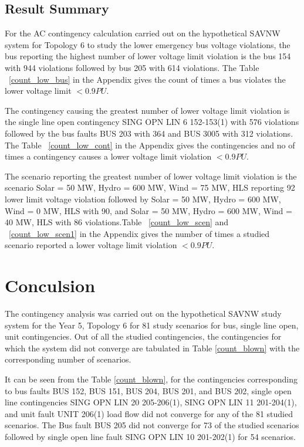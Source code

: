 \documentclass[10pt]{report}
\begin{document}
\section{Result Summary}
For the AC contingency calculation carried out on the hypothetical SAVNW system for Topology 6 to study the lower emergency bus voltage violations, the bus reporting the highest number of lower voltage limit violation is the bus 154 with 944 violations followed by bus 205 with 614 violations. The Table ~\ref{count_low_bus} in the Appendix gives the count of times a bus violates the lower voltage limit $ < 0.9 PU $. 


The contingency causing the greatest number of lower voltage limit violation is the single line open contingency SING OPN LIN 6 152-153(1) with 576 violations followed by the bus faults BUS 203 with 364 and BUS 3005 with 312 violations. The Table ~\ref{count_low_cont} in the Appendix gives the contingencies and no of times a contingency causes a lower voltage limit violation $ < 0.9 PU $.

The scenario reporting the greatest number of lower voltage limit violation is the scenario Solar = 50 MW, Hydro = 600 MW, Wind = 75 MW, HLS reporting 92 lower limit voltage violation followed by Solar = 50 MW, Hydro = 600 MW, Wind = 0 MW, HLS with 90, and Solar = 50 MW, Hydro = 600 MW, Wind = 40 MW, HLS with 86 violations.Table ~\ref{count_low_scen} and ~\ref{count_low_scen1} in the Appendix gives the number of times a studied scenario reported a lower voltage limit violation $ < 0.9 PU $.  



\chapter{Conculsion}
\label{conclusion} 

The contingency analysis was carried out on the hypothetical SAVNW study system for the Year 5, Topology 6 for 81 study scenarios for bus, single line open, unit contingencies. Out of all the studied contingencies, the contingencies for which the system did not converge are tabulated in Table \ref{count_blown} with the corresponding number of scenarios. 

It can be seen from the Table \ref{count_blown}, for the contingencies corresponding to bus faults BUS 152, BUS 151, BUS 204, BUS 201, and BUS 202, single open line contingencies SING OPN LIN   20 205-206(1), SING OPN LIN   11 201-204(1), and unit fault UNIT 206(1) load flow did not converge for any of the 81 studied scenarios. The Bus fault BUS 205 did not converge for 73 of the studied scenarios followed by single open line fault SING OPN LIN   10 201-202(1) for 54 scenarios. 
\end{document}
